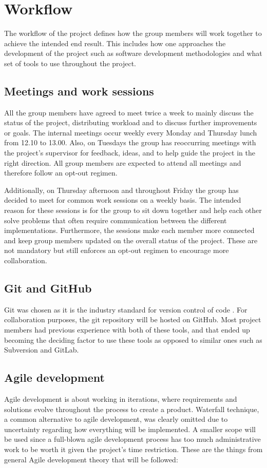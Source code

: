 \section{Workflow}

The workflow of the project defines how the group members will work together to achieve the intended end result.
This includes how one approaches the development of the project such as software development methodologies and what set of tools to use throughout the project.

\subsection{Meetings and work sessions} 
All the group members have agreed to meet twice a week to mainly discuss the status of the project, distributing workload and to discuss further improvements or goals.
The internal meetings occur weekly every Monday and Thursday lunch from 12.10 to 13.00.
Also, on Tuesdays the group has reoccurring meetings with the project's supervisor for feedback, ideas, and to help guide the project in the right direction.
All group members are expected to attend all meetings and therefore follow an opt-out regimen.

Additionally, on Thursday afternoon and throughout Friday the group has decided to meet for common work sessions on a weekly basis.
The intended reason for these sessions is for the group to sit down together and help each other solve problems that often require communication between the different implementations.
Furthermore, the sessions make each member more connected and keep group members updated on the overall status of the project.
These are not mandatory but still enforces an opt-out regimen to encourage more collaboration.

\subsection{Git and GitHub}
Git was chosen as it is the industry standard for version control of code \cite{git_industry_standard}.
For collaboration purposes, the git repository will be hosted on GitHub.
Most project members had previous experience with both of these tools, and that ended up becoming the deciding factor to use these tools as opposed to similar ones such as Subversion and GitLab.

\subsection{Agile development}
Agile development is about working in iterations, where requirements and solutions evolve throughout the process to create a product. 
Waterfall technique, a common alternative to agile development, was clearly omitted due to uncertainty regarding how everything will be implemented. 
A smaller scope will be used since a full-blown agile development process has too much administrative work to be worth it given the project's time restriction.
These are the things from general Agile development theory that will be followed:

